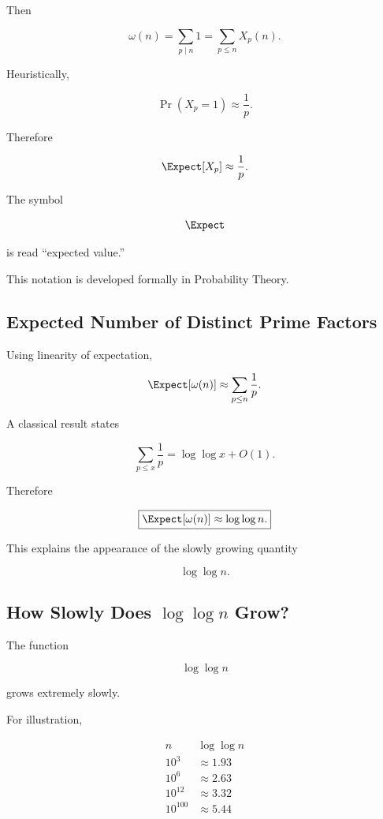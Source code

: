 Then

\[ \boxed{\omega(n)=\sum_{p\mid n}1=\sum_{p\leq n}X_p(n).} \]

Heuristically,

\[ \Pr(X_p=1)\approx\frac1p. \]

Therefore

\[ \Expect[X_p]\approx\frac1p. \]

The symbol

\[ \Expect \]

is read ``expected value.''

This notation is developed formally in Probability Theory.

\subsection{Expected Number of Distinct Prime Factors}
\label{subsec:expected-distinct-prime-factors}

Using linearity of expectation,

\[
\Expect[\omega(n)]
\approx
\sum_{p\leq n}\frac1p.
\]

A classical result states

\[ \sum_{p\leq x}\frac1p=\log\log x+O(1). \]

Therefore

\[ \boxed{\Expect[\omega(n)]\approx\log\log n.} \]

This explains the appearance of the slowly growing quantity

\[ \log\log n. \]

\subsection{How Slowly Does \(\log\log n\) Grow?}
\label{subsec:log-log-growth}

The function

\[ \log\log n \]

grows extremely slowly.

For illustration,

\[
\begin{array}{c|c}
n & \log\log n\\
\hline
10^3 & \approx1.93\\
10^6 & \approx2.63\\
10^{12} & \approx3.32\\
10^{100} & \approx5.44
\end{array}
\]

